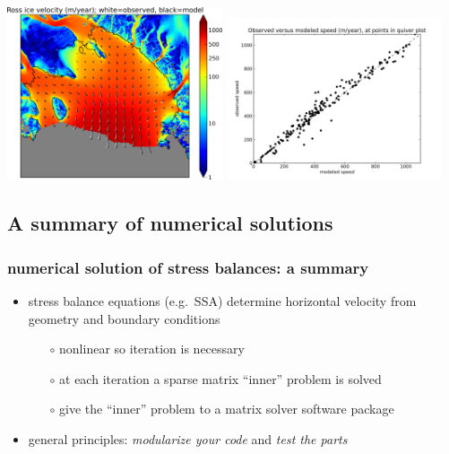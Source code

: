 \documentclass[titlepage,letterpaper,final,12pt]{scrartcl}
\begin{document}
\begin{center}
  \includegraphics[width=2.5in]{rossquiver}
  \quad
  \includegraphics[width=2.5in]{rossscatter}
\end{center}


\subsection{A summary of numerical solutions}

\subsubsection*{numerical solution of stress balances: a summary}

\begin{itemize}
\item stress balance equations (e.g.~SSA) determine horizontal velocity from geometry and boundary conditions
  \begin{itemize}
  \item[$\circ$] nonlinear so iteration is necessary
  \item[$\circ$] at each iteration a sparse matrix ``inner'' problem is solved
  \item[$\circ$] give the ``inner'' problem to a matrix solver software package
  \end{itemize}
\item general principles: \emph{modularize your code} and \emph{test the parts}
\end{itemize}
\end{document}
